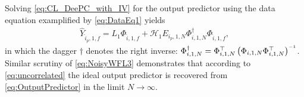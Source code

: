Solving \eqref{eq:CL_DeePC_with_IV} for the output predictor using the data equation examplified by \eqref{eq:DataEq1} yields
\begin{align}\label{eq:OutputPredictor}
    \widehat{Y}_{\hat{i}_p,1,f} = L_1 \Phi_{\hat{i},1,f} + \mathcal{H}_1 E_{i_p,1,N}\Phi_{i,1,N}^\dagger\Phi_{\hat{i},1,f},
\end{align}
in which the dagger $\dagger$ denotes the right inverse: ${\Phi_{i,1,N}^\dagger=\Phi_{i,1,N}^\top\left(\Phi_{i,1,N}\Phi_{i,1,N}^\top\right)\inv}$. Similar scrutiny of \eqref{eq:NoisyWFL3} demonstrates that according to \eqref{eq:uncorrelated} the ideal output predictor is recovered from \eqref{eq:OutputPredictor} in the limit $N\rightarrow\infty$.


